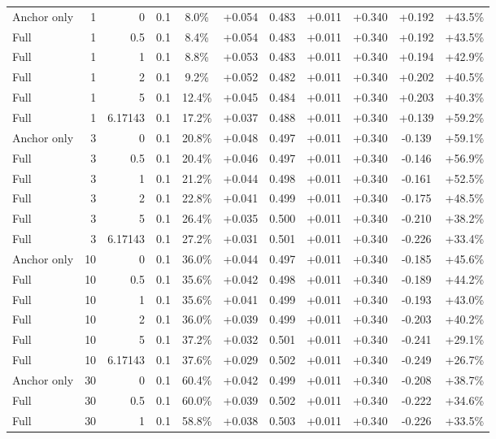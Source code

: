 \begin{table}[htbp]
\begin{tabular}{lrrrccccccc}
Anchor only & 1 & 0 & 0.1 & 8.0\% & +0.054 & 0.483 & +0.011 & +0.340 & +0.192 & +43.5\% \\
Full & 1 & 0.5 & 0.1 & 8.4\% & +0.054 & 0.483 & +0.011 & +0.340 & +0.192 & +43.5\% \\
Full & 1 & 1 & 0.1 & 8.8\% & +0.053 & 0.483 & +0.011 & +0.340 & +0.194 & +42.9\% \\
Full & 1 & 2 & 0.1 & 9.2\% & +0.052 & 0.482 & +0.011 & +0.340 & +0.202 & +40.5\% \\
Full & 1 & 5 & 0.1 & 12.4\% & +0.045 & 0.484 & +0.011 & +0.340 & +0.203 & +40.3\% \\
Full & 1 & 6.17143 & 0.1 & 17.2\% & +0.037 & 0.488 & +0.011 & +0.340 & +0.139 & +59.2\% \\
Anchor only & 3 & 0 & 0.1 & 20.8\% & +0.048 & 0.497 & +0.011 & +0.340 & -0.139 & +59.1\% \\
Full & 3 & 0.5 & 0.1 & 20.4\% & +0.046 & 0.497 & +0.011 & +0.340 & -0.146 & +56.9\% \\
Full & 3 & 1 & 0.1 & 21.2\% & +0.044 & 0.498 & +0.011 & +0.340 & -0.161 & +52.5\% \\
Full & 3 & 2 & 0.1 & 22.8\% & +0.041 & 0.499 & +0.011 & +0.340 & -0.175 & +48.5\% \\
Full & 3 & 5 & 0.1 & 26.4\% & +0.035 & 0.500 & +0.011 & +0.340 & -0.210 & +38.2\% \\
Full & 3 & 6.17143 & 0.1 & 27.2\% & +0.031 & 0.501 & +0.011 & +0.340 & -0.226 & +33.4\% \\
Anchor only & 10 & 0 & 0.1 & 36.0\% & +0.044 & 0.497 & +0.011 & +0.340 & -0.185 & +45.6\% \\
Full & 10 & 0.5 & 0.1 & 35.6\% & +0.042 & 0.498 & +0.011 & +0.340 & -0.189 & +44.2\% \\
Full & 10 & 1 & 0.1 & 35.6\% & +0.041 & 0.499 & +0.011 & +0.340 & -0.193 & +43.0\% \\
Full & 10 & 2 & 0.1 & 36.0\% & +0.039 & 0.499 & +0.011 & +0.340 & -0.203 & +40.2\% \\
Full & 10 & 5 & 0.1 & 37.2\% & +0.032 & 0.501 & +0.011 & +0.340 & -0.241 & +29.1\% \\
Full & 10 & 6.17143 & 0.1 & 37.6\% & +0.029 & 0.502 & +0.011 & +0.340 & -0.249 & +26.7\% \\
Anchor only & 30 & 0 & 0.1 & 60.4\% & +0.042 & 0.499 & +0.011 & +0.340 & -0.208 & +38.7\% \\
Full & 30 & 0.5 & 0.1 & 60.0\% & +0.039 & 0.502 & +0.011 & +0.340 & -0.222 & +34.6\% \\
Full & 30 & 1 & 0.1 & 58.8\% & +0.038 & 0.503 & +0.011 & +0.340 & -0.226 & +33.5\% \\

\end{tabular}
\end{table}
